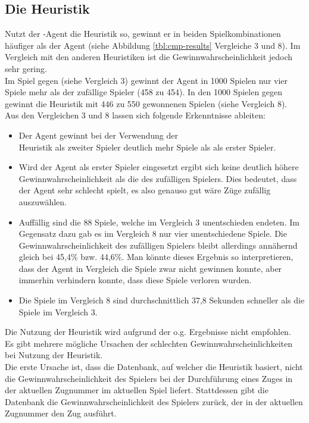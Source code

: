 \subsection{Die Heuristik }
\label{fz:h_smc}
Nutzt der \mxZitat{\abp}-Agent die  Heuristik so, gewinnt er in beiden Spielkombinationen häufiger als der  Agent (siehe Abbildung \ref{tbl:cmp-results} Vergleiche 3 und 8). Im Vergleich mit den anderen Heuristiken ist die Gewinnwahrscheinlichkeit jedoch sehr gering.
\\Im Spiel  gegen  (siehe Vergleich 3) gewinnt der Agent in 1000 Spielen nur vier Spiele mehr als der zufällige Spieler (458 zu 454). In den 1000 Spielen  gegen  gewinnt die Heuristik mit 446 zu 550 gewonnenen Spielen (siehe Vergleich 8).
\\Aus den Vergleichen 3 und 8 lassen sich folgende Erkenntnisse ableiten:
\begin{itemize}
\item Der Agent \mxZitat{\abp} gewinnt bei der Verwendung der \\ Heuristik als zweiter Spieler deutlich mehr Spiele als als erster Spieler.
\item Wird der Agent als erster Spieler eingesetzt ergibt sich keine deutlich höhere Gewinnwahrscheinlichkeit als die des zufälligen Spielers. Dies bedeutet, dass der Agent sehr schlecht spielt, es also genauso gut wäre Züge zufällig auszuwählen. 
\item Auffällig sind die 88 Spiele, welche im Vergleich 3 unentschieden endeten. Im Gegensatz dazu gab es im Vergleich 8 nur vier unentschiedene Spiele. Die Gewinnwahrscheinlichkeit des zufälligen Spielers bleibt allerdings annähernd gleich bei 45,4\% bzw. 44,6\%. Man könnte dieses Ergebnis so interpretieren, dass der Agent in Vergleich die Spiele zwar nicht gewinnen konnte, aber immerhin verhindern konnte, dass diese Spiele verloren wurden.
\item Die Spiele im Vergleich 8 sind durchschnittlich 37,8 Sekunden schneller als die Spiele im Vergleich 3.
\end{itemize}
Die Nutzung der Heuristik  wird aufgrund der o.g. Ergebnisse nicht empfohlen.
\\Es gibt mehrere mögliche Ursachen der schlechten Gewinnwahrscheinlichkeiten bei Nutzung der Heuristik.
\vspace{0.5cm}
\\Die erste Ursache ist, dass die Datenbank, auf welcher die Heuristik basiert, nicht die Gewinnwahrscheinlichkeit des Spielers bei der Durchführung eines Zuges in der aktuellen Zugnummer im aktuellen Spiel liefert. Stattdessen gibt die Datenbank die Gewinnwahrscheinlichkeit des Spielers zurück, der in der aktuellen Zugnummer den Zug ausführt.
